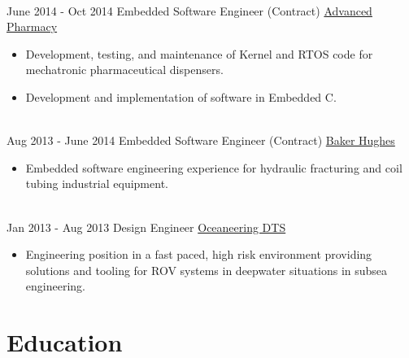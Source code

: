 \documentclass[letterpaper]{twentysecondcv} %
\begin{document}
\begin{twenty}
{{\begin{itemize}
					\end{itemize}}
				}
				\\
				\twentyitem
				{June 2014 -}
				{Oct 2014}
				{Embedded Software Engineer (Contract)}
				{\href{https://www.advancedpharmacy.com/}{Advanced Pharmacy}}
				{}
				{
					\begin{itemize}
						\item Development, testing, and maintenance of Kernel and RTOS code for mechatronic pharmaceutical dispensers.
						\item Development and implementation of software in Embedded C. 
						
					\end{itemize}
				}
				
				\\
				\twentyitem
				{Aug 2013 -}
				{June 2014}
				{Embedded Software Engineer (Contract)}
				{\href{https://www.bakerhughes.com/}{Baker Hughes}}
				{}
				{
					\begin{itemize}
						\item Embedded software engineering experience for hydraulic fracturing and coil tubing industrial equipment. 
					\end{itemize}
				}
				\\
				\twentyitem
				{Jan 2013 -}
				{Aug 2013}
				{Design Engineer}
				{\href{https://www.oceaneering.com/intervention-tooling/}{Oceaneering DTS}}
				{}
				{
					\begin{itemize}
						\item Engineering position in a fast paced, high risk environment providing solutions and tooling for ROV systems in deepwater situations in subsea engineering.
					\end{itemize}
				}
				
				
			\end{twenty}


\section{Education}
\end{document}

